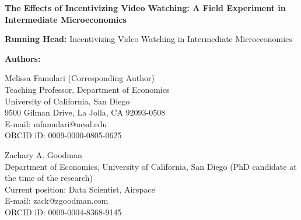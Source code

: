 




\begin{titlepage}
	\begin{center}
		\textbf{The Effects of Incentivizing Video Watching: A Field Experiment in Intermediate Microeconomics}
	\end{center}

	\vspace{1\baselineskip}
	\noindent\textbf{Running Head:} Incentivizing Video Watching in Intermediate Microeconomics

	\vspace{1\baselineskip}
	\noindent\textbf{Authors:}

	\noindent Melissa Famulari (Corresponding Author)\\
	Teaching Professor, Department of Economics\\
    University of California, San Diego\\%
	9500 Gilman Drive, La Jolla, CA 92093-0508\\%
	E-mail: mfamulari@ucsd.edu\\
	ORCID iD: 0009-0000-0805-0625

	\vspace{0.5\baselineskip}
	\noindent Zachary A. Goodman\\
	Department of Economics, University of California, San Diego (PhD candidate at the time of the research)\\
    Current position: Data Scientist, Airspace\\
	E-mail: zack@zgoodman.com\\
	ORCID iD: 0009-0004-8368-9145
\end{titlepage}

\setcounter{page}{2}


